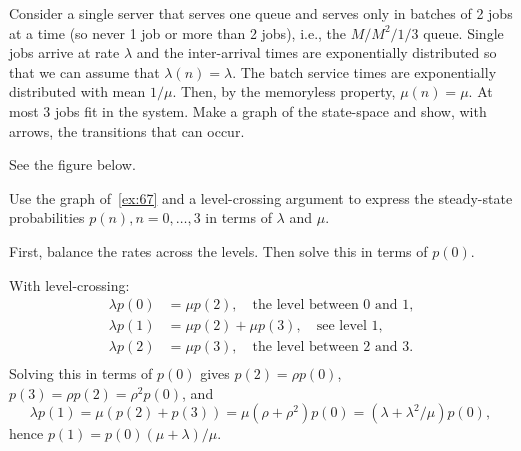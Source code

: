 \begin{exercise}
Consider a single server that serves one queue and serves only in batches of 2 jobs at a time (so never 1 job or more than 2 jobs), i.e., the $M/M^2/1/3$ queue.
 Single jobs arrive at rate $\lambda$ and the inter-arrival times are exponentially distributed so that we can assume that $\lambda(n) = \lambda$.
 The batch service times are exponentially distributed with mean $1/\mu$.
 Then, by the memoryless property, $\mu(n) = \mu$.
 At most 3 jobs fit in the system.
 Make a graph of the state-space and show, with arrows, the transitions that can occur.

\begin{solution}
See the figure below.

\end{solution}
\end{exercise}

\begin{exercise}
 Use the graph of~\cref{ex:67} and a level-crossing argument to express the steady-state probabilities $p(n), n=0,\ldots, 3$ in terms of $\lambda$ and $\mu$.
\begin{hint}
First, balance the rates across the levels. Then solve this in terms of $p(0)$.
\end{hint}
\begin{solution}
With level-crossing:
 \begin{align*}
 \lambda p(0) &= \mu p(2), \quad\text{the level between 0 and 1,}\\
 \lambda p(1) &= \mu p(2) +\mu p(3), \quad\text{see level 1,}\\
 \lambda p(2) &= \mu p(3), \quad\text{the level between 2 and 3.}\\
 \end{align*}
 Solving this in terms of $p(0)$ gives $p(2) = \rho p(0)$, $p(3) = \rho p(2) = \rho^2p(0)$, and
 \begin{equation*}
 \lambda p(1) = \mu(p(2) + p(3)) = \mu (\rho + \rho^2) p(0) = (\lambda + \lambda^2/\mu) p(0),
 \end{equation*}
hence $p(1) = p(0)(\mu + \lambda)/\mu$. 
\end{solution}
\end{exercise}




